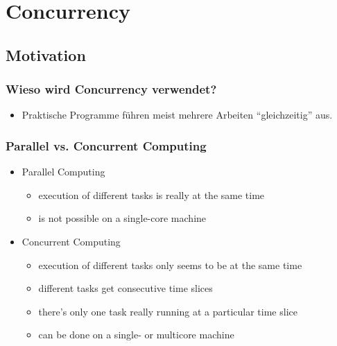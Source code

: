 \section{Concurrency}

\subsection{Motivation}
\subsubsection{Wieso wird Concurrency verwendet?}
\begin{itemize}
  \item Praktische Programme führen meist mehrere Arbeiten "`gleichzeitig"' aus.
\end{itemize}

\subsubsection{Parallel vs. Concurrent Computing}
\begin{itemize}
  \item Parallel Computing
        \begin{itemize}
          \item execution of different tasks is really at the same time
          \item is not possible on a single-core machine
        \end{itemize}
  \item Concurrent Computing
        \begin{itemize}
          \item execution of different tasks only seems to be at the same time
          \item different tasks get consecutive time slices
          \item there's only one task really running at a particular time slice
          \item can be done on a single- or multicore machine
        \end{itemize}
\end{itemize}

